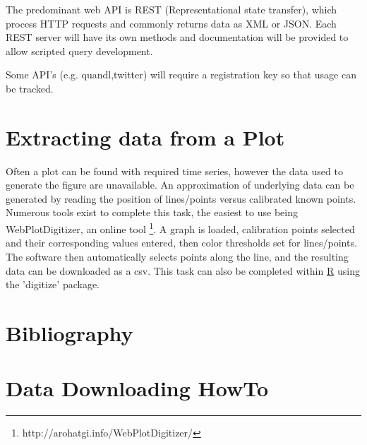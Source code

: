 \documentclass[11pt]{article}
\begin{document}
	The predominant web API is REST (Representational state transfer), which process HTTP requests and commonly returns data as XML or JSON.
	Each REST server will have its own methods and documentation will be provided to allow scripted query development.


	Some API's (e.g. quandl,twitter) will require a registration key so that usage can be tracked.

	\section{Extracting data from a Plot}\label{graph}
	Often a plot can be found with required time series, however the data used to generate the figure are unavailable.
	An approximation of underlying data can be generated by reading the position of lines/points versus calibrated known points. 
	Numerous tools exist to complete this task, the easiest to use being WebPlotDigitizer, an online tool \footnote{http://arohatgi.info/WebPlotDigitizer/}. 
	A graph is loaded, calibration points selected and their corresponding values entered, then color thresholds set for lines/points.
	The software then automatically selects points along the line, and the resulting data can be downloaded as a csv.
	This task can also be completed within \hyperref[R]{R} using the 'digitize' package.

\newpage
\section{Bibliography}


\section{Data Downloading HowTo}
\end{document}
